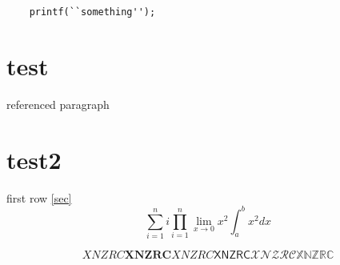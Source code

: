 \documentclass{book}
\begin{document}
\LaTeXe
\begin{verbatim}
    printf(``something'');
\end{verbatim}

\chapter{test}
referenced paragraph\label{sec}

\chapter{test2}
first \pageref{sec} row \ref{sec}
\[\sum^n_{i=1} i \prod^n_{i=1} \lim_{x\to0}x^2 \int_a^b x^2 dx\]


\begin{equation}
XNZRC
\mathbf{XNZRC}
\mathit{XNZRC}
\mathsf{XNZRC}
\mathcal{XNZRC}
\mathbb{XNZRC}
\end{equation}
\end{document}
